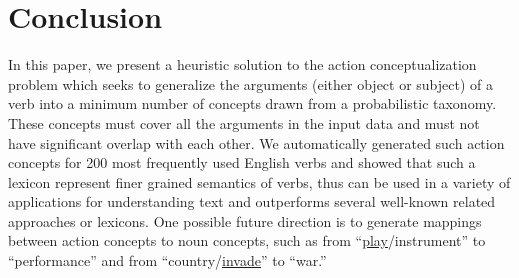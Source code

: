 \section{Conclusion}
\label{sec:conclude}
In this paper, we present a heuristic solution to the
action conceptualization problem which seeks to generalize the
arguments (either object or subject) of a verb into a minimum number
of concepts drawn from a probabilistic taxonomy. These concepts
must cover all the arguments in the input data and must not have
significant overlap with each other. We automatically generated
such action concepts for 200 most frequently used English verbs and
showed that such a lexicon represent finer grained semantics of
verbs, thus can be used in a variety of applications for
understanding text and outperforms several well-known related approaches
or lexicons. One possible future direction is to generate mappings
between action concepts to noun concepts, such as from
``\underline{play}/instrument'' to ``performance'' and from
``country/\underline{invade}'' to ``war.''

